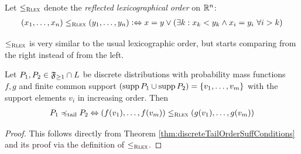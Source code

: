 \documentclass[a4paper]{scrreprt}
\begin{document}
    \begin{defn}
        Let $\leq_{\textsc{Rlex}}$ denote the \emph{reflected lexicographical order} on $\mathbb{R}^n$:
        \begin{gather*}
            (x_1, \dots, x_n) \leq_{\textsc{Rlex}} (y_1, \dots, y_n) \mathrel{\vcentcolon\Leftrightarrow} x = y \vee (\exists k: x_k < y_k \wedge x_i = y_i ~\forall i > k)
        \end{gather*}
    \end{defn}
    $\leq_{\textsc{Rlex}}$ is very similar to the usual lexicographic order, but starts comparing from the right instead of from the left.
    
    \begin{cor}
        Let $P_1, P_2 \in \mathfrak{F}_{\geq 1} \cap L$ be discrete distributions with probability mass functions $f, g$ and finite common support $(\operatorname{supp} P_1 \cup \operatorname{supp} P_2) = \{v_1, \dots, v_m\}$ with the support elements $v_i$ in increasing order. Then
        \begin{gather}            
            P_1 \preccurlyeq_{\text{tail}} P_2 \Leftrightarrow (f(v_1), \dots, f(v_m)) \leq_{\textsc{Rlex}} (g(v_1), \dots, g(v_m))
            \label{eq:discreteFiniteTailOrder-RLexEqivalence}
        \end{gather}
    \end{cor}
    \begin{proof}
        This follows directly from Theorem \ref{thm:discreteTailOrderSuffConditions} and its proof via the definition of $\leq_{\textsc{Rlex}}$.
    \end{proof}
\end{document}
